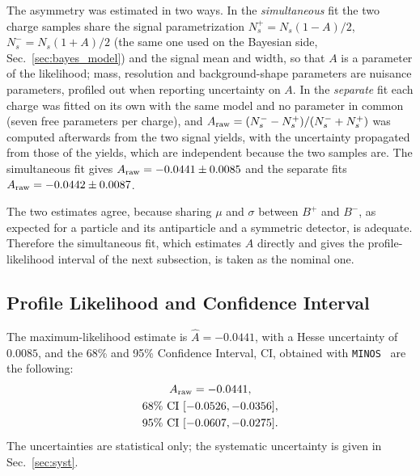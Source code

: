 The asymmetry was estimated in two ways. In the \emph{simultaneous} fit the two charge samples share the signal parametrization $N_s^+=N_s(1-A)/2$, $N_s^-=N_s(1+A)/2$ (the same one used on the Bayesian side, Sec.~\ref{sec:bayes_model}) and the signal mean and width, so that $A$ is a parameter of the likelihood; mass, resolution and background-shape parameters are nuisance parameters, profiled out when reporting uncertainty on $A$. In the \emph{separate} fit each charge was fitted on its own with the same model and no parameter in common (seven free parameters per charge), and $A_{\mathrm{raw}}=(N_s^--N_s^+)/(N_s^-+N_s^+)$ was computed afterwards from the two signal yields, with the uncertainty propagated from those of the yields, which are independent because the two samples are. The simultaneous fit gives $A_{\mathrm{raw}}=-0.0441\pm0.0085$ and the separate fits $A_{\mathrm{raw}}=-0.0442\pm0.0087$.

The two estimates agree, because sharing $\mu$ and $\sigma$ between $B^+$ and $B^-$, as expected for a particle and its antiparticle and a symmetric detector, is adequate.
Therefore the simultaneous fit, which estimates $A$ directly and gives the profile-likelihood interval of the next subsection, is taken as the nominal one.

\subsection{Profile Likelihood and Confidence Interval}
\label{sec:freq_ci}


The maximum-likelihood estimate is $\hat A=-0.0441$, with a Hesse uncertainty of $0.0085$, and the 68\% and 95\% Confidence Interval, CI, obtained with \texttt{MINOS}~\cite{minuit} are the following:
\begin{gather*}
A_{\mathrm{raw}} = -0.0441, \\
68\%~\text{CI}~[-0.0526, -0.0356], \\ 95\%~\text{CI}~[-0.0607, -0.0275].
\end{gather*}
The uncertainties are statistical only; the systematic uncertainty is given in Sec.~\ref{sec:syst}.

